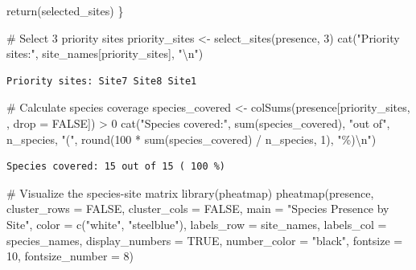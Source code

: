 \documentclass[
  letterpaper,
]{book}
\newenvironment{Shaded}{\begin{snugshade}}{\end{snugshade}}
\newcommand{\AttributeTok}[1]{\textcolor[rgb]{0.40,0.45,0.13}{#1}}
\newcommand{\CommentTok}[1]{\textcolor[rgb]{0.37,0.37,0.37}{#1}}
\newcommand{\ConstantTok}[1]{\textcolor[rgb]{0.56,0.35,0.01}{#1}}
\newcommand{\DecValTok}[1]{\textcolor[rgb]{0.68,0.00,0.00}{#1}}
\newcommand{\FunctionTok}[1]{\textcolor[rgb]{0.28,0.35,0.67}{#1}}
\newcommand{\NormalTok}[1]{\textcolor[rgb]{0.00,0.23,0.31}{#1}}
\newcommand{\OtherTok}[1]{\textcolor[rgb]{0.00,0.23,0.31}{#1}}
\newcommand{\SpecialCharTok}[1]{\textcolor[rgb]{0.37,0.37,0.37}{#1}}
\newcommand{\StringTok}[1]{\textcolor[rgb]{0.13,0.47,0.30}{#1}}
\begin{document}
\begin{Shaded}
\begin{Highlighting}[]
  \FunctionTok{return}\NormalTok{(selected\_sites)}
\NormalTok{\}}

\CommentTok{\# Select 3 priority sites}
\NormalTok{priority\_sites }\OtherTok{\textless{}{-}} \FunctionTok{select\_sites}\NormalTok{(presence, }\DecValTok{3}\NormalTok{)}
\FunctionTok{cat}\NormalTok{(}\StringTok{"Priority sites:"}\NormalTok{, site\_names[priority\_sites], }\StringTok{"}\SpecialCharTok{\textbackslash{}n}\StringTok{"}\NormalTok{)}
\end{Highlighting}
\end{Shaded}

\begin{verbatim}
Priority sites: Site7 Site8 Site1 
\end{verbatim}

\begin{Shaded}
\begin{Highlighting}[]
\CommentTok{\# Calculate species coverage}
\NormalTok{species\_covered }\OtherTok{\textless{}{-}} \FunctionTok{colSums}\NormalTok{(presence[priority\_sites, , }\AttributeTok{drop =} \ConstantTok{FALSE}\NormalTok{]) }\SpecialCharTok{\textgreater{}} \DecValTok{0}
\FunctionTok{cat}\NormalTok{(}\StringTok{"Species covered:"}\NormalTok{, }\FunctionTok{sum}\NormalTok{(species\_covered), }\StringTok{"out of"}\NormalTok{, n\_species, }
    \StringTok{"("}\NormalTok{, }\FunctionTok{round}\NormalTok{(}\DecValTok{100} \SpecialCharTok{*} \FunctionTok{sum}\NormalTok{(species\_covered) }\SpecialCharTok{/}\NormalTok{ n\_species, }\DecValTok{1}\NormalTok{), }\StringTok{"\%)}\SpecialCharTok{\textbackslash{}n}\StringTok{"}\NormalTok{)}
\end{Highlighting}
\end{Shaded}

\begin{verbatim}
Species covered: 15 out of 15 ( 100 %)
\end{verbatim}

\begin{Shaded}
\begin{Highlighting}[]
\CommentTok{\# Visualize the species{-}site matrix}
\FunctionTok{library}\NormalTok{(pheatmap)}
\FunctionTok{pheatmap}\NormalTok{(presence, }
        \AttributeTok{cluster\_rows =} \ConstantTok{FALSE}\NormalTok{, }
        \AttributeTok{cluster\_cols =} \ConstantTok{FALSE}\NormalTok{,}
        \AttributeTok{main =} \StringTok{"Species Presence by Site"}\NormalTok{,}
        \AttributeTok{color =} \FunctionTok{c}\NormalTok{(}\StringTok{"white"}\NormalTok{, }\StringTok{"steelblue"}\NormalTok{),}
        \AttributeTok{labels\_row =}\NormalTok{ site\_names,}
        \AttributeTok{labels\_col =}\NormalTok{ species\_names,}
        \AttributeTok{display\_numbers =} \ConstantTok{TRUE}\NormalTok{,}
        \AttributeTok{number\_color =} \StringTok{"black"}\NormalTok{,}
        \AttributeTok{fontsize =} \DecValTok{10}\NormalTok{,}
        \AttributeTok{fontsize\_number =} \DecValTok{8}\NormalTok{)}
\end{Highlighting}
\end{Shaded}
\end{document}
